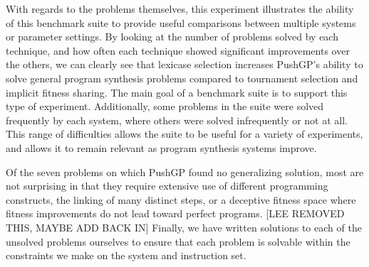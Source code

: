 \documentclass{sig-alternate}
\begin{document}
%

With regards to the problems themselves, this experiment illustrates the ability of this benchmark suite to provide useful comparisons between multiple systems or parameter settings. By looking at the number of problems solved by each technique, and how often each technique showed significant improvements over the others, we can clearly see that lexicase selection increases PushGP's ability to solve general program synthesis problems compared to tournament selection and implicit fitness sharing. The main goal of a benchmark suite is to support this type of experiment. Additionally, some problems in the suite were solved frequently by each system, where others were solved infrequently or not at all. This range of difficulties allows the suite to be useful for a variety of experiments, and allows it to remain relevant as program synthesis systems improve.

Of the seven problems on which PushGP found no generalizing solution, most are not surprising in that they require extensive use of different programming constructs, the linking of many distinct steps, or a deceptive fitness space where fitness improvements do not lead toward perfect programs. 
[LEE REMOVED THIS, MAYBE ADD BACK IN] Finally, we have written solutions to each of the unsolved problems ourselves to ensure that each problem is solvable within the constraints we make on the system and instruction set.




\end{document}
